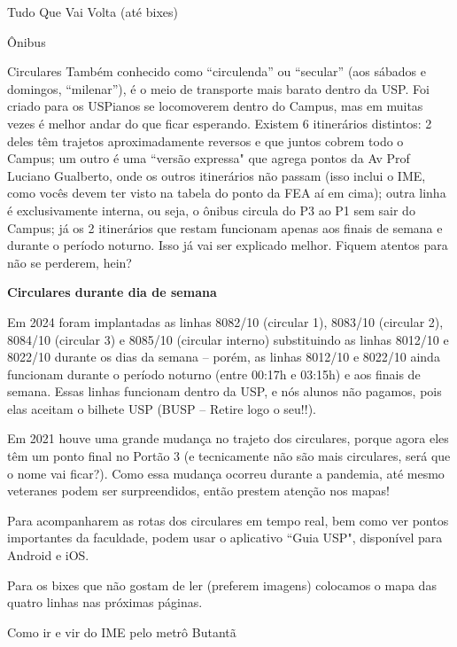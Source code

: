 \begin{secao}{Tudo Que Vai Volta (até bixes)}
\begin{subsecao}{Ônibus}
\begin{subsubsecao}{Circulares}
Também conhecido como ``circulenda'' ou ``secular'' (aos sábados e domingos,
``milenar''), é o meio de transporte mais barato dentro da USP. Foi criado para
os USPianos se locomoverem dentro do Campus, mas em muitas vezes é melhor andar
do que ficar esperando. Existem 6 itinerários distintos: 2 deles têm trajetos
aproximadamente reversos e que juntos cobrem todo o Campus; um outro é uma
``versão expressa" que agrega pontos da Av Prof Luciano Gualberto, onde os outros
itinerários não passam (isso inclui o IME, como vocês devem ter visto na
tabela do ponto da FEA aí em cima); outra linha é exclusivamente interna, ou seja,
o ônibus circula do P3 ao P1 sem sair do Campus; já os 2 itinerários que restam 
funcionam apenas aos finais de semana e durante o período noturno. Isso já vai ser 
explicado melhor. Fiquem atentos para não se perderem, hein?

{\bf Circulares durante dia de semana}

Em 2024 foram implantadas as linhas 8082/10 (circular 1), 8083/10 (circular 2), 
8084/10 (circular 3) e 8085/10 (circular interno) substituindo as linhas 8012/10 e 
8022/10 durante os dias da semana -- porém, as linhas 8012/10 e 8022/10 ainda funcionam 
durante o período noturno (entre 00:17h e 03:15h) e aos finais de semana. Essas linhas 
funcionam dentro da USP, e nós alunos não pagamos, pois elas aceitam o bilhete USP 
(BUSP -- Retire logo o seu!!).

Em 2021 houve uma grande mudança no trajeto dos circulares, porque agora eles
têm um ponto final no Portão 3 (e tecnicamente não são mais circulares, será que
o nome vai ficar?). Como essa mudança ocorreu durante a pandemia, até mesmo
veteranes podem ser surpreendidos, então prestem atenção nos mapas!

Para acompanharem as rotas dos circulares em tempo real, bem como ver pontos
importantes da faculdade, podem usar o aplicativo ``Guia USP", disponível para
Android e iOS.

Para os bixes que não gostam de ler (preferem imagens) colocamos o
mapa das quatro linhas nas próximas páginas.



\end{subsubsecao}

\begin{subsubsecao}{Como ir e vir do IME pelo metrô Butantã}


\end{subsubsecao}
\end{subsecao}
\end{secao}
